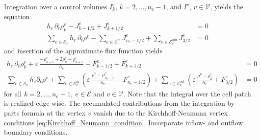 Integration over a control volumes $I_k^e$, $k=2,\ldots,n_e-1$, and $I^v$, $v\in \mathcal{V}$, yields the equation
\begin{align*}
	h_e\,\partial_t \rho_k^e - J^e_{k-1/2} + J^e_{k+1/2} &= 0 \\
	\sum_{e\in \mathcal{E}_v} h_e\,\partial_t \rho^v
	- \sum_{e\in \mathcal{E}_v^{\text{in}}} J^e_{n_e-1/2} 
	+ \sum_{e\in \mathcal{E}_v^{\text{out}}} J^e_{3/2} &= 0
\end{align*}
and insertion of the approximate flux function yields
\begin{align*}
	h_e\,\partial_t \rho_k^e + \varepsilon\,\frac{-\rho_{k-1}^e +
	2\rho_k^e - \rho_{k+1}^e}{h_e} - F_{k-1/2}^e + F_{k+1/2}^e &= 0
	  \\
	\sum_{e\in \mathcal{E}_v} h_e\partial_t\rho^v
	+ \sum_{e\in \mathcal{E}_v^{\text{in}}}
	\left(\varepsilon\,\frac{\rho^v-\rho_{n_e-1}^e}{h_e} -
	F^e_{n_e-1/2}\right)
	+ \sum_{e\in \mathcal{E}_v^{\text{out}}}
	\left(\varepsilon\,\frac{\rho^v-\rho_2^e}{h_e} + F^e_{3/2}\right)
	&= 0
\end{align*}
for all $k=2,\ldots,n_e-1,\ e\in \mathcal{E}$ and $v\in \mathcal{V}$. Note that the integral over the cell patch is realized edge-wise. The accumulated contributions from the integration-by-parts formula at the vertex $v$ vanish due to the Kirchhoff-Neumann vertex conditions \eqref{eq:Kirchhoff_Neumann_condition}. Incorporate inflow- and outflow boundary conditions.

